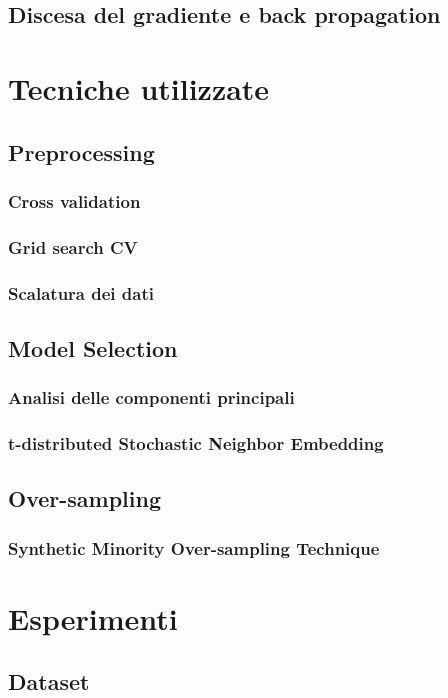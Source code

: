 \documentclass[12pt, twoside, letterpaper]{report}
\begin{document}
		\section{Discesa del gradiente e back propagation}
		
	\chapter{Tecniche utilizzate}
		\section{Preprocessing}
			\subsection{Cross validation}
			\subsection{Grid search CV}
			\subsection{Scalatura dei dati}
		\section{Model Selection}			
			\subsection{Analisi delle componenti principali}
			\subsection{t-distributed Stochastic Neighbor Embedding}
		\section{Over-sampling}
			\subsection{Synthetic Minority Over-sampling Technique}
		
	\chapter{Esperimenti}
		\section{Dataset}
\end{document}
